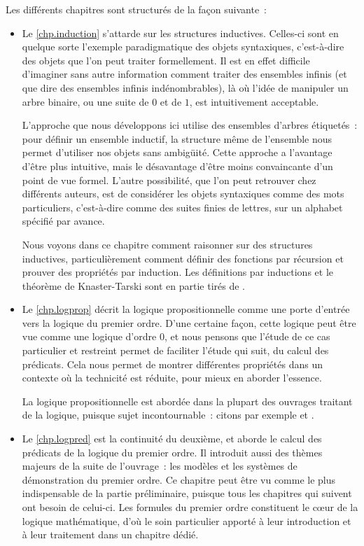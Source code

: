 Les différents chapitres sont structurés de la façon suivante~:
\begin{itemize}
\item Le \cref{chp.induction} s'attarde sur les structures inductives. Celles-ci
  sont en quelque sorte l'exemple paradigmatique des objets syntaxiques,
  c'est-à-dire des objets que l'on peut traiter formellement. Il est en effet
  difficile d'imaginer sans autre information comment traiter des ensembles
  infinis (et que dire des ensembles infinis indénombrables), là où l'idée de
  manipuler un arbre binaire, ou une suite de $0$ et de $1$, est intuitivement
  acceptable.

  L'approche que nous développons ici utilise des ensembles d'arbres étiquetés~:
  pour définir un ensemble inductif, la structure même de l'ensemble nous permet
  d'utiliser nos objets sans ambigüité. Cette approche a l'avantage d'être plus
  intuitive, mais le désavantage d'être moins convaincante d'un point de vue
  formel. L'autre possibilité, que l'on peut retrouver chez différents auteurs,
  est de considérer les objets syntaxiques comme des mots particuliers,
  c'est-à-dire comme des suites finies de lettres, sur un alphabet spécifié par
  avance.

  Nous voyons dans ce chapitre comment raisonner sur des structures inductives,
  particulièrement comment définir des fonctions par récursion et prouver des
  propriétés par induction. Les définitions par inductions et le théorème de
  Knaster-Tarski sont en partie tirés de \cite{winskell1996formal}.
\item Le \cref{chp.logprop} décrit la logique propositionnelle comme une porte
  d'entrée vers la logique du premier ordre. D'une certaine façon, cette logique
  peut être vue comme une logique d'ordre $0$, et nous pensons que l'étude de ce
  cas particulier et restreint permet de faciliter l'étude qui suit, du calcul
  des prédicats. Cela nous permet de montrer différentes propriétés dans un
  contexte où la technicité est réduite, pour mieux en aborder l'essence.

  La logique propositionnelle est abordée dans la plupart des ouvrages traitant
  de la logique, puisque sujet incontournable~: citons par exemple
  \cite{cori2003logique} et \cite{raffalli:hal-00396917}.
\item Le \cref{chp.logpred} est la continuité du deuxième, et aborde le calcul
  des prédicats de la logique du premier ordre. Il introduit aussi des thèmes
  majeurs de la suite de l'ouvrage~: les modèles et les systèmes de
  démonstration du premier ordre. Ce chapitre peut être vu comme le plus
  indispensable de la partie préliminaire, puisque tous les chapitres qui
  suivent ont besoin de celui-ci. Les formules du premier ordre constituent le
  c\oe ur de la logique mathématique, d'où le soin particulier apporté à leur
  introduction et à leur traitement dans un chapitre dédié.


\end{itemize}
